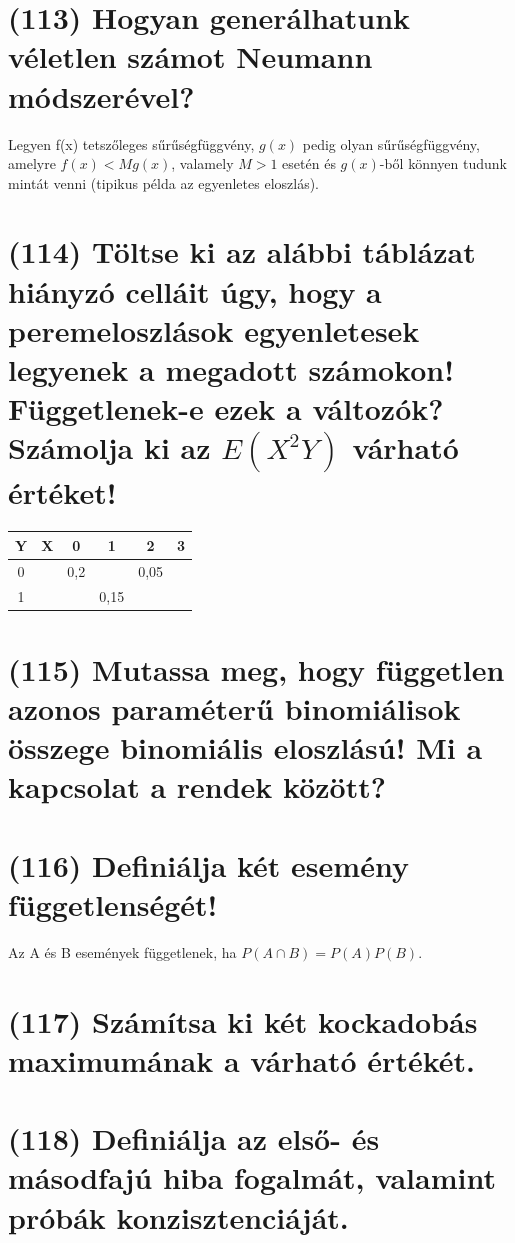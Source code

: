 \documentclass[12p]{article}
\begin{document}
\section{(113)  Hogyan generálhatunk véletlen számot Neumann módszerével?}

Legyen f(x) tetszőleges sűrűségfüggvény, $g(x)$ pedig olyan sűrűségfüggvény, amelyre $f(x) < Mg(x)$, valamely $M>1$ esetén és $g(x)$-ből könnyen tudunk mintát venni (tipikus példa az egyenletes eloszlás).

\section{(114) Töltse ki az alábbi táblázat hiányzó celláit úgy, hogy a peremeloszlások egyenletesek
legyenek a megadott számokon! Függetlenek-e ezek a változók? Számolja ki az $E(X^2Y)$ várható értéket!}

\begin{center}
 \begin{tabular}{| c c || c | c | c | c |} 
 \hline
 Y & X &  0 & 1 & 2 & 3\\ [0.5ex] 
 \hline\hline
 0 &  & 0,2 & & 0,05 & \\ 
 \hline
 1 &  & & 0,15 & & \\
 \hline\hline
\end{tabular}
\end{center}

\section{(115) Mutassa meg, hogy független azonos paraméterű binomiálisok összege binomiális eloszlású! Mi a kapcsolat a rendek között?}

\section{(116) Definiálja két esemény függetlenségét!}

Az A és B események függetlenek, ha $P(A \cap B) = P(A)P(B)$.

\section{(117) Számítsa ki két kockadobás maximumának a várható értékét.}

\section{(118) Definiálja az első- és másodfajú hiba fogalmát, valamint próbák konzisztenciáját.}
\end{document}
